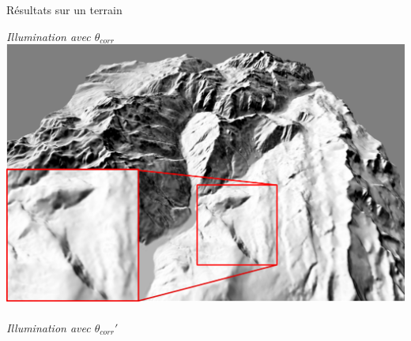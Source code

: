 \documentclass{beamer}
\begin{document}
\begin{frame}{Résultats sur un terrain}
\begin{center}
\begin{minipage}[t]{0.4\linewidth}
\begin{center}
 		\textit{Illumination avec $\theta_{corr}$}
        \includegraphics[width=0.9\linewidth]{Resultats/ombrage_continue.png}~\\
 		\textit{Illumination avec $\theta_{corr}'$}
    \end{center}
    \end{minipage}
\end{center}


\end{frame}




\end{document}
